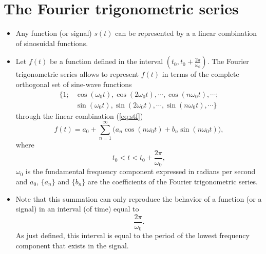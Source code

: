 \section{The Fourier trigonometric series}
\begin{itemize}
\item Any function (or signal) $s(t)$ can be represented by a a linear
  combination of sinosuidal functions.
\item Let $f(t)$ be a function defined in the interval $(t_0,
  t_0+\frac{2\pi}{\omega_0})$. The Fourier trigonometric series allows
  to represent $f(t)$ in terms of the complete orthogonal set of
  sine-wave
  functions~\cite{Oppenheim} \begin{equation*} \begin{array}{ll} \{1;
  & \cos(\omega_0t), \cos(2\omega_0t), \cdots, \cos(n\omega_0t), \cdots;\\
  & \sin(\omega_0t), \sin(2\omega_0t), \cdots, \sin(n\omega_0t), \cdots\} \end{array} \end{equation*}
  through the linear combination (\ref{eq:stf}) \begin{equation} f(t)
  = a_0 + \sum_{n=1}^\infty \big(a_n \cos(n\omega_0t) +
  b_n \sin(n\omega_0t)\big), \tag{stf} \label{eq:stf} \end{equation}
  where $$t_0<t<t_0+\frac{2\pi}{\omega_0},$$ $\omega_0$ is the fundamental
  frequency component expressed in radians per second and $a_0$, $\{a_n\}$
  and $\{b_n\}$ are the coefficients of the Fourier trigonometric series.
\item Note that this summation can only reproduce the behavior of a
  function (or a signal) in an interval (of time) equal to
  \begin{displaymath}
    \frac{2\pi}{\omega_0}.
  \end{displaymath}
  As just defined, this interval is equal to the period of the lowest
  frequency component that exists in the signal.
\end{itemize}

